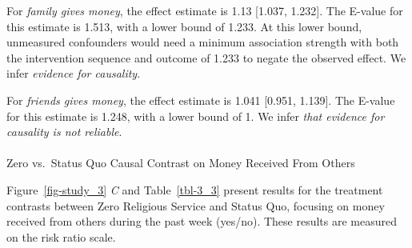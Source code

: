 \documentclass[
  single column]{article}
\makeatletter
\let\oldparagraph\paragraph
\renewcommand{\paragraph}{
    \@ifstar
      \xxxParagraphStar
      \xxxParagraphNoStar
  }
\newcommand{\xxxParagraphStar}[1]{\oldparagraph*{#1}\mbox{}}
\newcommand{\xxxParagraphNoStar}[1]{\oldparagraph{#1}\mbox{}}
\makeatother
\begin{document}
For \emph{family gives money}, the effect estimate is 1.13 {[}1.037,
1.232{]}. The E-value for this estimate is 1.513, with a lower bound of
1.233. At this lower bound, unmeasured confounders would need a minimum
association strength with both the intervention sequence and outcome of
1.233 to negate the observed effect. We infer \emph{evidence for
causality}.

For \emph{friends gives money}, the effect estimate is 1.041 {[}0.951,
1.139{]}. The E-value for this estimate is 1.248, with a lower bound of
1. We infer \emph{that evidence for causality is not reliable}.

\paragraph{Zero vs.~Status Quo Causal Contrast on Money Received From
Others}\label{zero-vs.-status-quo-causal-contrast-on-money-received-from-others}

Figure~\ref{fig-study_3} \emph{C} and Table~\ref{tbl-3_3} present
results for the treatment contrasts between Zero Religious Service and
Status Quo, focusing on money received from others during the past week
(yes/no). These results are measured on the risk ratio scale.
\end{document}
